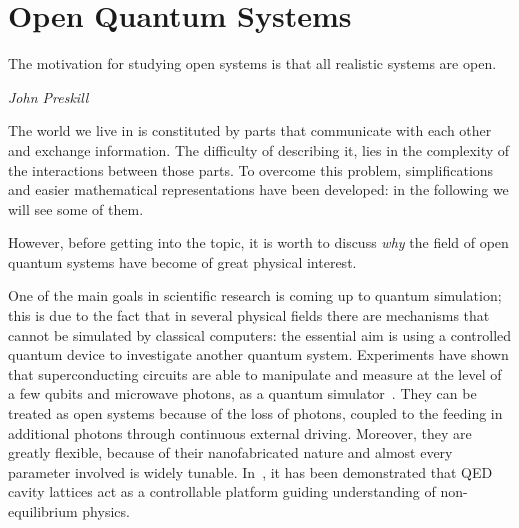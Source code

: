 \chapter{Open Quantum Systems}
\label{Chapter1}
\epigraph{The motivation for studying open systems is that all realistic systems are open.}{\textit{John Preskill}}

\newcommand{\keyword}[1]{\textbf{#1}}
\newcommand{\tabhead}[1]{\textbf{#1}}
\newcommand{\code}[1]{\texttt{#1}}
\newcommand{\file}[1]{\texttt{\bfseries#1}}
\newcommand{\option}[1]{\texttt{\itshape#1}}

The world we live in is constituted by parts that communicate with each other and exchange information. The difficulty of describing it, lies in the complexity of the interactions between those parts. To overcome this problem, simplifications and easier mathematical representations have been developed: in the following we will see some of them.

However, before getting into the topic, it is worth to discuss \emph{why} the field of open quantum systems have become of great physical interest.

One of the main goals in scientific research is coming up to quantum simulation; this is due to the fact that in several physical fields there are mechanisms that cannot be simulated by classical computers: the essential aim is using a controlled quantum device to investigate another quantum system. Experiments have shown that superconducting circuits are able to manipulate and measure at the level of a few qubits and microwave photons, as a quantum simulator~\cite{Nat.Phys2012}. They can be treated as open systems because of the loss of photons, coupled to the feeding in additional photons through continuous external driving. Moreover, they are greatly flexible, because of their nanofabricated nature and almost every parameter involved is widely tunable. In~\cite{PhysRevX.7.011016}, it has been demonstrated that QED cavity lattices act as a controllable platform guiding understanding of non-equilibrium physics. 

